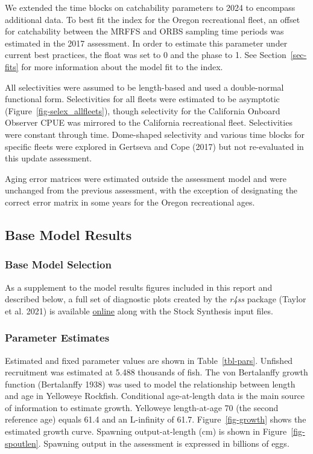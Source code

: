\documentclass[
  english,
]{article}
\begin{document}
We extended the time blocks on catchability parameters to 2024 to
encompass additional data. To best fit the index for the Oregon
recreational fleet, an offset for catchability between the MRFFS and
ORBS sampling time periods was estimated in the 2017 assessment. In
order to estimate this parameter under current best practices, the float
was set to 0 and the phase to 1. See Section~\ref{sec-fits} for more
information about the model fit to the index.

All selectivities were assumed to be length-based and used a
double-normal functional form. Selectivities for all fleets were
estimated to be asymptotic (Figure~\ref{fig-selex_allfleets}), though
selectivity for the California Onboard Observer CPUE was mirrored to the
California recreational fleet. Selectivities were constant through time.
Dome-shaped selectivity and various time blocks for specific fleets were
explored in Gertseva and Cope (2017) but not re-evaluated in this update
assessment.

Aging error matrices were estimated outside the assessment model and
were unchanged from the previous assessment, with the exception of
designating the correct error matrix in some years for the Oregon
recreational ages.

\subsection{Base Model Results}\label{base-model-results}

\subsubsection{Base Model Selection}\label{base-model-selection}

As a supplement to the model results figures included in this report and
described below, a full set of diagnostic plots created by the
\emph{r4ss} package (Taylor et al. 2021) is available
\href{https://github.com/rclairer/Sebastes_ruberrimus_2025}{online}
along with the Stock Synthesis input files.

\subsubsection{Parameter Estimates}\label{parameter-estimates}

Estimated and fixed parameter values are shown in Table~\ref{tbl-pars}.
Unfished recruitment was estimated at 5.488 thousands of fish. The von
Bertalanffy growth function (Bertalanffy 1938) was used to model the
relationship between length and age in Yelloweye Rockfish. Conditional
age-at-length data is the main source of information to estimate growth.
Yelloweye length-at-age 70 (the second reference age) equals 61.4 and an
L-infinity of 61.7. Figure~\ref{fig-growth} shows the estimated growth
curve. Spawning output-at-length (cm) is shown in
Figure~\ref{fig-spoutlen}. Spawning output in the assessment is
expressed in billions of eggs.
\end{document}
